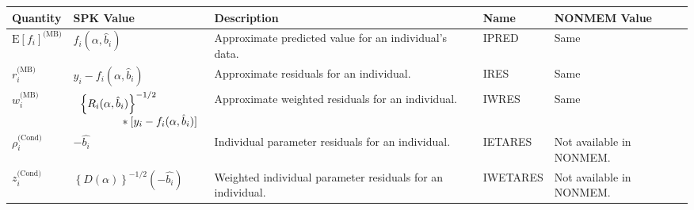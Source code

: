 \documentclass{article}
\begin{document}
\begin{center}
\begin{tabular}{|p{0.75in}|p{3.25in}|p{1.1in}|p{0.85in}|p{1.0in}|}
\hline
\hline
  {\bf Quantity}
    & {\bf SPK Value}
    & {\bf Description}
    & {\bf Name}
    & {\bf NONMEM Value} \\
  \hline
  \hline
  $\mbox{E} \left[ f_i \right]^{\mbox{(MB)}}$
    & $f_i(\alpha, \hat{b}_i)$
    & Approximate predicted value for an individual's data.
    & IPRED 
    & Same\\
  \hline
  $r^{\mbox{(MB)}}_i$
    & $y_i - f_i(\alpha, \hat{b}_i)$
    & Approximate residuals for an individual.
    & IRES 
    & Same\\
  \hline
  $w^{\mbox{(MB)}}_i$
    & $\begin{array}{l}
        \left\{ R_i(\alpha, \hat{b}_i) \right\}^{-1/2} \\
        \mbox{\hspace{0.5in}}
        \ast [ y_i - f_i(\alpha, \hat{b}_i)]
      \end{array} $
    & Approximate weighted residuals for an individual.
    & IWRES 
    & Same\\
  \hline
  $\rho^{\mbox{(Cond)}}_i$
    & $-\hat{b_i}$
    & Individual parameter residuals for an individual.
    & IETARES
    & Not available in NONMEM. \\
  \hline
  $z^{\mbox{(Cond)}}_i$
    & $\left\{ D(\alpha) \right\}^{-1/2} ( - \hat{b_i} )$
    & Weighted individual parameter residuals for an individual.
    & IWETARES
    & Not available in NONMEM. \\
  \hline
  \hline
\end{tabular}
\end{center}


%
%

%
%
\end{document}
